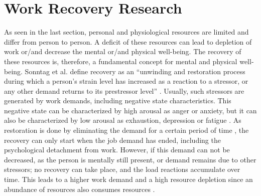 \documentclass{hasel_thesis}
\begin{document}
 \section{Work Recovery Research}

As seen in the last section, personal and physiological resources are limited and differ from person to person. A deficit of these resources can lead to depletion of work or/and decrease the mental or/and physical well-being. The recovery of these resources is, therefore, a fundamental concept for mental and physical well-being. Sonntag et al. define recovery as an “unwinding and restoration process during which a person’s strain level has increased as a reaction to a stressor, or any other demand returns to its prestressor level” \cite[p.366]{Sonnentag.2017}. Usually, such stressors are generated by work demands, including negative state characteristics. This negative state can be characterized by high arousal as anger or anxiety, but it can also be characterized by low arousal as exhaustion, depression or fatigue \cite{Sonnentag.2022}. As restoration is done by eliminating the demand for a certain period of time \cite{Trougakos.2009}, the recovery can only start when the job demand has ended, including the psychological detachment from work. 
However, if this demand can not be decreased, as the person is mentally still present, or demand remains due to other stressors; no recovery can take place, and the load reactions accumulate over time. This leads to a higher work demand and a high resource depletion since an abundance of resources also consumes resources \cite{Trougakos.2009}.
\end{document}
